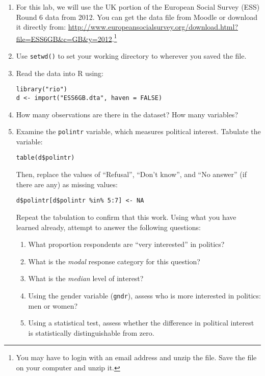 \documentclass[a4paper,12pt]{article}
\begin{document}
\begin{enumerate}
\item For this lab, we will use the UK portion of the European Social Survey (ESS) Round 6 data from 2012. You can get the data file from Moodle or download it directly from: \url{http://www.europeansocialsurvey.org/download.html?file=ESS6GB&c=GB&y=2012}.\footnote{You may have to login with an email address and unzip the file. Save the file on your computer and unzip it.}

\item Use \texttt{setwd()} to set your working directory to wherever you saved the file.

\item Read the data into R using: 

\begin{verbatim}
library("rio")
d <- import("ESS6GB.dta", haven = FALSE)
\end{verbatim}

\item How many observations are there in the dataset? How many variables?

\item Examine the \texttt{polintr} variable, which measures political interest. Tabulate the variable:

\begin{verbatim}
table(d$polintr)
\end{verbatim}

\noindent Then, replace the values of ``Refusal'', ``Don't know'', and ``No answer'' (if there are any) as missing values: 

\begin{verbatim}
d$polintr[d$polintr %in% 5:7] <- NA
\end{verbatim}

\noindent Repeat the tabulation to confirm that this work. Using what you have learned already, attempt to answer the following questions:

\begin{enumerate}
\item What proportion respondents are ``very interested'' in politics?	
\item What is the \textit{modal} response category for this question?
\item What is the \textit{median} level of interest?
\item Using the gender variable (\texttt{gndr}), assess who is more interested in politics: men or women?
\item Using a statistical test, assess whether the difference in political interest is statistically distinguishable from zero.
\end{enumerate}


\end{enumerate}
\end{document}
